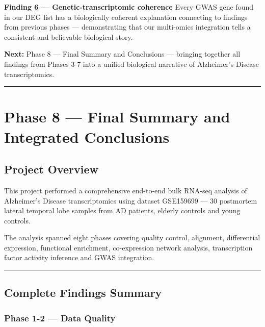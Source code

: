 \documentclass[
]{article}
\begin{document}
\textbf{Finding 6 --- Genetic-transcriptomic coherence} Every GWAS gene
found in our DEG list has a biologically coherent explanation connecting
to findings from previous phases --- demonstrating that our multi-omics
integration tells a consistent and believable biological story.

\textbf{Next:} Phase 8 --- Final Summary and Conclusions --- bringing
together all findings from Phases 3-7 into a unified biological
narrative of Alzheimer's Disease transcriptomics.

\begin{center}\rule{0.5\linewidth}{0.5pt}\end{center}

\section{Phase 8 --- Final Summary and Integrated
Conclusions}\label{phase-8-final-summary-and-integrated-conclusions}

\subsection{Project Overview}\label{project-overview-1}

This project performed a comprehensive end-to-end bulk RNA-seq analysis
of Alzheimer's Disease transcriptomics using dataset GSE159699 --- 30
postmortem lateral temporal lobe samples from AD patients, elderly
controls and young controls.

The analysis spanned eight phases covering quality control, alignment,
differential expression, functional enrichment, co-expression network
analysis, transcription factor activity inference and GWAS integration.

\begin{center}\rule{0.5\linewidth}{0.5pt}\end{center}

\subsection{Complete Findings Summary}\label{complete-findings-summary}

\subsubsection{Phase 1-2 --- Data Quality}\label{phase-1-2-data-quality}
\end{document}
